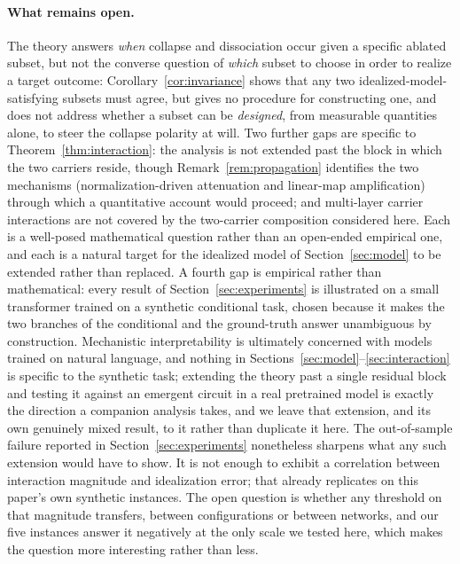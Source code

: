 \documentclass[11pt,a4paper]{article}
\begin{document}
\paragraph{What remains open.} The theory answers \emph{when} collapse and
dissociation occur given a specific ablated subset, but not the converse
question of \emph{which} subset to choose in order to realize a target
outcome: Corollary~\ref{cor:invariance} shows that any two idealized-model-satisfying
subsets must agree, but gives no procedure for constructing one, and does not
address whether a subset can be \emph{designed}, from measurable quantities
alone, to steer the collapse polarity at will. Two further gaps are
specific to Theorem~\ref{thm:interaction}: the analysis is not extended past the block in which
the two carriers reside, though Remark~\ref{rem:propagation} identifies the
two mechanisms (normalization-driven attenuation and linear-map
amplification) through which a quantitative account would proceed;
and multi-layer carrier interactions are not covered by the two-carrier
composition considered here. Each is a well-posed mathematical question
rather than an open-ended empirical one, and each is a natural target for the
idealized model of Section~\ref{sec:model} to be extended rather than
replaced. A fourth gap is empirical rather than mathematical: every result of
Section~\ref{sec:experiments} is illustrated on a small transformer trained
on a synthetic conditional task, chosen because it makes the two branches of
the conditional and the ground-truth answer unambiguous by construction.
Mechanistic interpretability is ultimately concerned with models trained on
natural language, and nothing in Sections~\ref{sec:model}--\ref{sec:interaction}
is specific to the synthetic task; extending the theory past a single
residual block and testing it against an emergent circuit in a real
pretrained model is exactly the direction a companion analysis takes, and we
leave that extension, and its own genuinely mixed result, to it rather than
duplicate it here. The out-of-sample failure reported in
Section~\ref{sec:experiments} nonetheless sharpens what any such extension
would have to show. It is not enough to exhibit a correlation between
interaction magnitude and idealization error; that already replicates on
this paper's own synthetic instances. The open question is whether any
threshold on that magnitude transfers, between configurations or between
networks, and our five instances answer it negatively at the only scale we
tested here, which makes the question more interesting rather than less.
\end{document}
